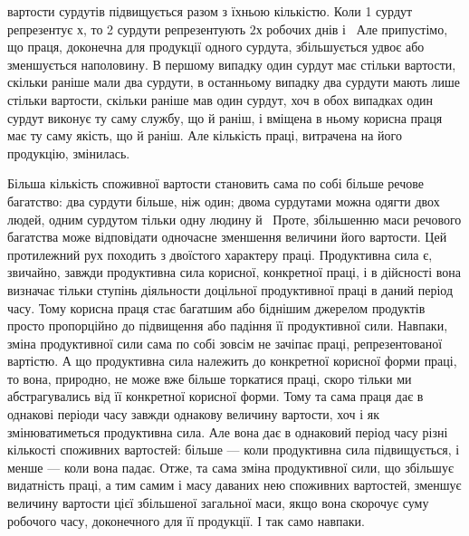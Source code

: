 \parcont{}  %
вартости сурдутів підвищується разом з їхньою кількістю. Коли
1 сурдут репрезентує $х$, то 2 сурдути репрезентують $2х$ робочих
днів і~ Але припустімо, що праця, доконечна для продукції
одного сурдута, збільшується удвоє або зменшується наполовину.
В першому випадку один сурдут має стільки вартости, скільки
раніше мали два сурдути, в останньому випадку два сурдути
мають лише стільки вартости, скільки раніше мав один сурдут,
хоч в обох випадках один сурдут виконує ту саму службу, що й
раніш, і вміщена в ньому корисна праця має ту саму якість, що
й раніш. Але кількість праці, витрачена на його продукцію,
змінилась.

Більша кількість споживної вартости становить сама по собі
більше речове багатство: два сурдути більше, ніж один; двома
сурдутами можна одягти двох людей, одним сурдутом тільки одну
людину й~ Проте, збільшенню маси речового багатства може
відповідати одночасне зменшення величини його вартости. Цей
протилежний рух походить з двоїстого характеру праці. Продуктивна
сила є, звичайно, завжди продуктивна сила корисної, конкретної
праці, і в дійсності вона визначає тільки ступінь діяльности
доцільної продуктивної праці в даний період часу. Тому
корисна праця стає багатшим або біднішим джерелом продуктів
просто пропорційно до підвищення або падіння її продуктивної
сили. Навпаки, зміна продуктивної сили сама по собі зовсім не
зачіпає праці, репрезентованої вартістю. А що продуктивна сила належить
до конкретної корисної форми праці, то вона, природно, не
може вже більше торкатися праці, скоро тільки ми абстрагувались
від її конкретної корисної форми. Тому та сама праця дає в однакові
періоди часу завжди однакову величину вартости, хоч і як
змінюватиметься продуктивна сила. Але вона дає в однаковий
період часу різні кількості споживних вартостей: більше — коли
продуктивна сила підвищується, і менше — коли вона падає. Отже,
та сама зміна продуктивної сили, що збільшує видатність праці,
а тим самим і масу даваних нею споживних вартостей, зменшує
величину вартости цієї збільшеної загальної маси, якщо вона
скорочує суму робочого часу, доконечного для її продукції. І так
само навпаки.

